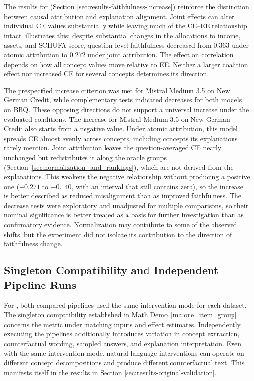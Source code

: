 The results for  (Section \ref{sec:results-faithfulness-increase}) reinforce the distinction between causal attribution and explanation alignment. Joint effects can alter individual CE values substantially while leaving much of the CE--EE relationship intact.  illustrates this: despite substantial changes in the allocations to income, assets, and SCHUFA score, question-level faithfulness decreased from $0.363$ under atomic attribution to $0.272$ under joint attribution. The effect on correlation depends on how all concept values move relative to EE. Neither a larger coalition effect nor increased CE for several concepts determines its direction.

The prespecified increase criterion was met for Mistral Medium 3.5 on New German Credit, while complementary tests indicated decreases for both models on BBQ. These opposing directions do not support a universal increase under the evaluated conditions. The increase for Mistral Medium 3.5 on New German Credit also starts from a negative value. Under atomic attribution, this model spreads CE almost evenly across concepts, including concepts its explanations rarely mention. Joint attribution leaves the question-averaged CE nearly unchanged but redistributes it along the oracle groups (Section~\ref{sec:normalization_and_rankings}), which are not derived from the explanations. This weakens the negative relationship without producing a positive one ($-0.271$ to $-0.140$, with an interval that still contains zero), so the increase is better described as reduced misalignment than as improved faithfulness. The decrease tests were exploratory and unadjusted for multiple comparisons, so their nominal significance is better treated as a basis for further investigation than as confirmatory evidence. Normalization may contribute to some of the observed shifts, but the experiment did not isolate its contribution to the direction of faithfulness change.

\subsection{Singleton Compatibility and Independent Pipeline Runs}
\label{sec:singleton_compatibility}

For , both compared pipelines used the same intervention mode for each dataset. The singleton compatibility established in Math Demo~\ref{ma:one_item_group} concerns the metric under matching inputs and effect estimates. Independently executing the pipelines additionally introduces variation in concept extraction, counterfactual wording, sampled answers, and explanation interpretation. Even with the same intervention mode, natural-language interventions can operate on different concept decompositions and produce different counterfactual text. This manifests itself in the results in Section \ref{sec:results-original-validation}.

